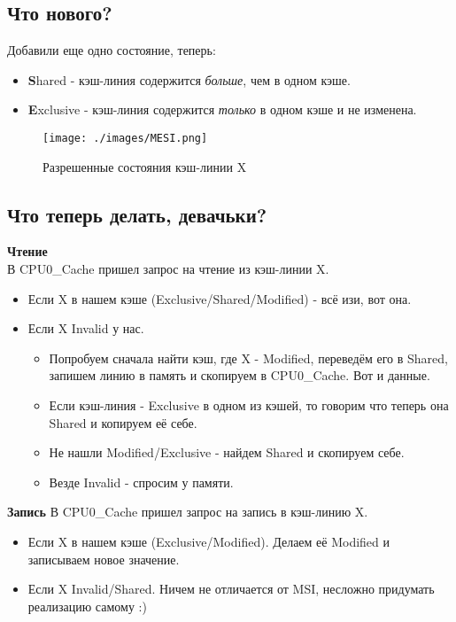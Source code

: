 \documentclass[12pt, a4paper]{article}
\begin{document}
\subsection{Что нового?}
Добавили еще одно состояние, теперь:
\begin{itemize}
    \item \textbf{S}hared - кэш-линия содержится \textit{больше}, чем в одном кэше.
    \item \textbf{E}xclusive - кэш-линия содержится \textit{только} в одном кэше и не изменена.
\end{itemize}
\begin{figure}[h]
    \centering
    \texttt{[image: ./images/MESI.png]}
    \caption{Разрешенные состояния кэш-линии X}
    \label{fig:MESI}
\end{figure}
\subsection{Что теперь делать, девачьки?}

\textbf{Чтение}\\
В CPU0\_Cache пришел запрос на чтение из кэш-линии X.
\begin{itemize}
    \item Если X в нашем кэше (Exclusive/Shared/Modified) - всё изи, вот она.
    \item Если X Invalid у нас.
    \begin{itemize}
        \item Попробуем сначала найти кэш, где X - Modified, переведём его в Shared, запишем линию в память и скопируем в CPU0\_Cache. Вот и данные.
        \item Если кэш-линия - Exclusive в одном из кэшей, то говорим что теперь она Shared и копируем её себе.
        \item Не нашли Modified/Exclusive - найдем Shared и скопируем себе.
        \item Везде Invalid - спросим у памяти.
    \end{itemize}
\end{itemize}

\textbf{Запись}
В CPU0\_Cache пришел запрос на запись в кэш-линию X.
\begin{itemize}
    \item Если X в нашем кэше (Exclusive/Modified). Делаем её Modified и записываем новое значение.
    \item Если X Invalid/Shared. Ничем не отличается от MSI, несложно придумать реализацию самому :)
\end{itemize}
\end{document}
